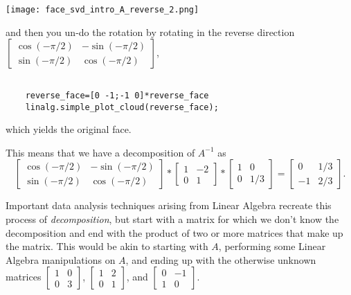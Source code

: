 \documentclass{ximera}
\begin{document}
\begin{center}
  \texttt{[image: face\_svd\_intro\_A\_reverse\_2.png]}
\end{center}

and then you un-do the rotation by rotating in the reverse direction $\begin{bmatrix}\cos(-\pi/2) & -\sin(-\pi/2)\\
  \sin(-\pi/2) & \cos(-\pi/2)\end{bmatrix}$,

  \begin{verbatim}

    reverse_face=[0 -1;-1 0]*reverse_face
    linalg.simple_plot_cloud(reverse_face);

  \end{verbatim}

which yields the original face.

This means that we have a decomposition of $A^{-1}$ as 
$$\begin{bmatrix}\cos(-\pi/2) & -\sin(-\pi/2)\\\sin(-\pi/2) & \cos(-\pi/2)\end{bmatrix}*\begin{bmatrix}1 &-2\\0 &1\end{bmatrix}*\begin{bmatrix}1 &0\\0 &1/3\end{bmatrix}=\begin{bmatrix}0 & 1/3\\-1 & 2/3\end{bmatrix}.$$

Important data analysis techniques arising from Linear Algebra recreate this process of \emph{decomposition}, but start with a matrix for which we don't know the decomposition and end with the product of two or more matrices that make up the matrix. This would be akin to starting with $A$, performing some Linear Algebra manipulations on $A$, and ending up with the otherwise unknown matrices $\begin{bmatrix} 1 & 0 \\ 0 & 3\end{bmatrix}$, $\begin{bmatrix} 1 & 2 \\ 0 & 1\end{bmatrix}$, and $\begin{bmatrix}0 & -1\\ 1 & 0\end{bmatrix}$. 
\end{document}
